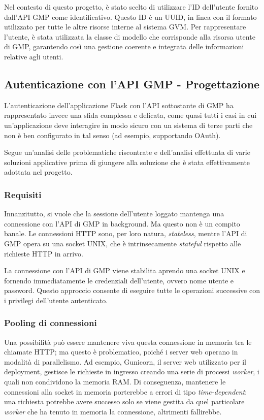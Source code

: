 Nel contesto di questo progetto, è stato scelto di utilizzare l'ID dell'utente fornito dall'API GMP come identificativo. Questo ID è un UUID, in linea con il formato utilizzato per tutte le altre risorse interne al sistema GVM. Per rappresentare l'utente, è stata utilizzata la classe di modello che corrisponde alla risorsa utente di GMP, garantendo così una gestione coerente e integrata delle informazioni relative agli utenti.

\subsection{Autenticazione con l'API GMP - Progettazione}
L'autenticazione dell'applicazione Flask con l'API sottostante di GMP ha rappresentato invece una sfida complessa e delicata, come quasi tutti i casi in cui un'applicazione deve interagire in modo sicuro con un sistema di terze parti che non è ben configurato in tal senso (ad esempio, supportando OAuth).

Segue un'analisi delle problematiche riscontrate e dell'analisi effettuata di varie soluzioni applicative prima di giungere alla soluzione che è stata effettivamente adottata nel progetto.

\subsubsection{Requisiti}
Innanzitutto, si vuole che la sessione dell'utente loggato mantenga una connessione con l'API di GMP in background. Ma questo non è un compito banale. Le connessioni HTTP sono, per loro natura, \emph{stateless}, mentre l'API di GMP opera su una socket UNIX, che è intrinsecamente \emph{stateful} rispetto alle richieste HTTP in arrivo.

La connessione con l'API di GMP viene stabilita aprendo una socket UNIX e fornendo immediatamente le credenziali dell'utente, ovvero nome utente e password. Questo approccio consente di eseguire tutte le operazioni successive con i privilegi dell'utente autenticato.

\subsubsection{Pooling di connessioni}
Una possibilità può essere mantenere viva questa connessione in memoria tra le chiamate HTTP; ma questo è problematico, poiché i server web operano in modalità di parallelismo. Ad esempio, Gunicorn, il server web utilizzato per il deployment, gestisce le richieste in ingresso creando una serie di processi \emph{worker}, i quali non condividono la memoria RAM. Di conseguenza, mantenere le connessioni alla socket in memoria porterebbe a errori di tipo \emph{time-dependent}: una richiesta potrebbe avere successo solo se viene gestita da quel particolare \emph{worker} che ha tenuto in memoria la connessione, altrimenti fallirebbe.

